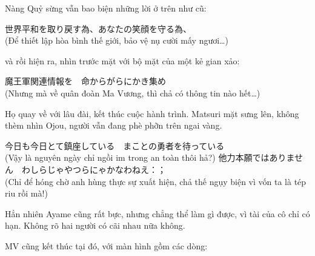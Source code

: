 \documentclass[../main.tex]{subfiles}
\begin{document}
Nàng Quỷ sừng vẫn bao biện những lời ở trên như cũ:
\begin{center}
  世界平和を取り戻す為、あなたの笑顔を守る為、 \\ (Để thiết lập hòa bình thế giới, bảo vệ nụ cười mấy ngươi\dots )
\end{center}
và rồi hiện ra, nhìn trước mặt với bộ mặt của một kẻ gian xảo:
\begin{center}
  魔王軍関連情報を　命からがらにかき集め \\ (Nhưng mà về quân đoàn Ma Vương, thì chả có thông tin nào hết\dots )
\end{center}

Họ quay về với lâu đài, kết thúc cuộc hành trình. Matsuri mặt sưng lên, không thèm nhìn Ojou, người vẫn đang phè phỡn trên ngai vàng.
\begin{dialogue}
   今日も今日とて鎮座している　まことの勇者を待っている \\ (Vậy là nguyên ngày chỉ ngồi im trong an toàn thôi hả?)
   他力本願ではありません　わしらじゃやつらにゃかなわねえ：； \\ (Chỉ để hóng chờ anh hùng thực sự xuất hiện, chả thế ngụy biện vì vốn ta là tép riu rồi mà!)
\end{dialogue}


Hẳn nhiên Ayame cũng rất bực, nhưng chẳng thể làm gì được, vì tài của cô chỉ có hạn. Không rõ hai người có cãi nhau nữa không.

MV cũng kết thúc tại đó, với màn hình gồm các dòng:
\end{document}
